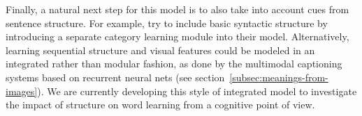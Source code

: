 
Finally, a natural next step for this model is to also take into
account cues from sentence structure. For example,
\citep{alishahi2012concurrent} try to include basic syntactic
structure by introducing a separate category learning module into
their model.  Alternatively, learning sequential structure and visual
features could be modeled in an integrated rather than modular
fashion, as done by the multimodal captioning systems based on
recurrent neural nets (see section~\ref{subsec:meanings-from-images}).
We are currently developing this style of integrated model
to investigate the impact of structure on word learning from a
cognitive point of view.
